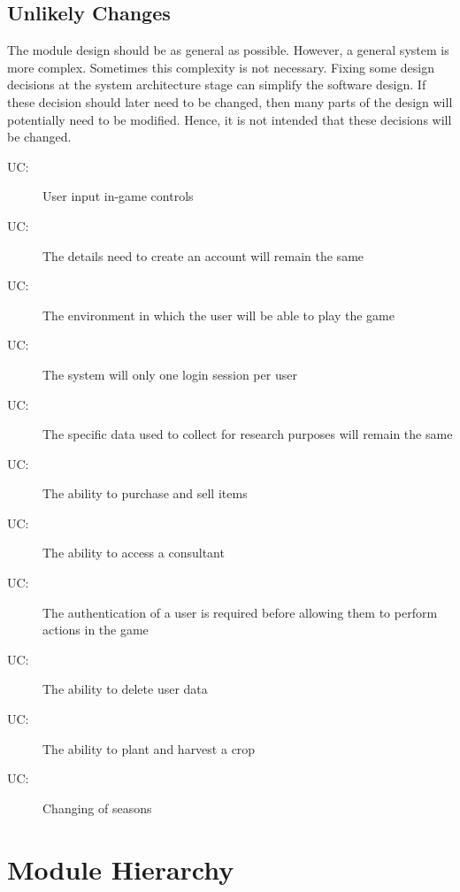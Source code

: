\documentclass[12pt, titlepage]{article}
\newcounter{ucnum}
\newcommand{\uctheucnum}{UC\theucnum}
\begin{document}
\subsection{Unlikely Changes} \label{SecUchange}

The module design should be as general as possible. However, a general system is
more complex. Sometimes this complexity is not necessary. Fixing some design
decisions at the system architecture stage can simplify the software design. If
these decision should later need to be changed, then many parts of the design
will potentially need to be modified. Hence, it is not intended that these
decisions will be changed.

\begin{description}
\item[ \uctheucnum \label{ucIO}:] User input in-game controls 
\item [ \uctheucnum \label{ucIO}:] The details need to create an account will remain the same
\item [ \uctheucnum \label{ucIO}:] The environment in which the user will be able to play the game
\item [ \uctheucnum \label{ucIO}:] The system will only one login session per user
\item [ \uctheucnum \label{ucIO}:] The specific data used to collect for research purposes will remain the same
\item [ \uctheucnum \label{ucIO}:] The ability to purchase and sell items
\item [ \uctheucnum \label{ucIO}:] The ability to access a consultant 
\item [ \uctheucnum \label{ucIO}:] The authentication of a user is required before allowing them to perform actions in the game 
\item [ \uctheucnum \label{ucIO}:] The ability to delete user data
\item [ \uctheucnum \label{ucIO}:] The ability to plant and harvest a crop
\item [ \uctheucnum \label{ucIO}:] Changing of seasons


\end{description}

\section{Module Hierarchy} \label{SecMH}
\end{document}
